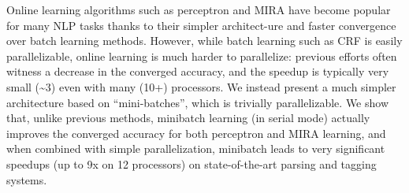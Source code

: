 Online learning algorithms such as perceptron and MIRA have become popular for many NLP tasks thanks to their simpler architect-ure and faster convergence
 over batch learning methods. However, while batch learning such as CRF is
 easily parallelizable, online learning is much harder to parallelize: previous
 efforts often witness a decrease in the converged accuracy, and the speedup is
 typically very small (\textasciitilde3) even with many (10+) processors. We instead present
 a much simpler architecture based on ``mini-batches'', which is trivially
 parallelizable. We show that, unlike previous methods, minibatch learning (in
 serial mode) actually improves the converged accuracy for both perceptron and
 MIRA learning, and when combined with simple parallelization, minibatch leads
 to very significant speedups (up to 9x on 12 processors) on state-of-the-art
 parsing and tagging systems.

